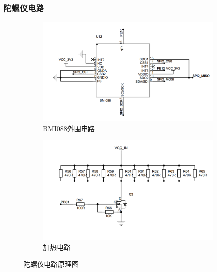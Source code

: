 \documentclass{beamer}
\begin{document}
		\begin{frame}
		\frametitle{陀螺仪电路}
		
		\begin{figure}[t]
			\centering
			\captionsetup{font=scriptsize} 
			\begin{subfigure}{0.45\textwidth}
				\centering
				\includegraphics[width=1.1\linewidth]{img/chapter4/imu1}
				\caption{BMI088外围电路}
			\end{subfigure}
			\hfill
			\begin{subfigure}{0.5\textwidth}
				\centering
				\includegraphics[width=1.1\linewidth]{img/chapter4/imu2}
				\caption{加热电路}
			\end{subfigure}
			
			\vspace{-5pt}
			\captionsetup{font=scriptsize} 
			\caption{陀螺仪电路原理图}
		\end{figure}
		
		\end{frame}
		
\end{document}
